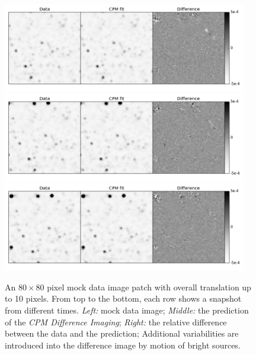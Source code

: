 \documentclass[12pt, preprint]{aastex}
\newcommand{\project}[1]{\textsl{#1}}
\newcommand{\cpmdiff}{\project{CPM Difference Imaging}}
\begin{document}
\begin{figure}[p]
\begin{center}
\includegraphics[width=0.95\textwidth]{f5a}
\includegraphics[width=0.95\textwidth]{f5b}
\includegraphics[width=0.95\textwidth]{f5c}
\end{center}
\caption{
  \label{large_motion}
  An $80\times 80$ pixel mock data image patch with overall translation up to 10 pixels. From top to the bottom,  each row shows a snapshot from different times.
  \emph{Left:} mock data image;
  \emph{Middle:} the prediction of the \cpmdiff;
  \emph{Right:} the relative difference between the data and the prediction; 
  Additional variabilities are introduced into the difference image by motion of bright sources.
}
\end{figure}
\end{document}
